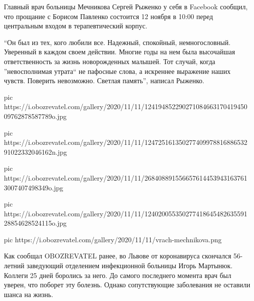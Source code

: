 Главный врач больницы Мечникова Сергей
Рыженко у себя в
Facebook
сообщил, что
прощание с Борисом Павленко состоится 12 ноября в 10:00 перед центральным
входом в терапевтический корпус.

\enquote{Он был из тех, кого любили все. Надежный, спокойный, немногословный. Уверенный
в каждом своем действии. Многие годы на нем была высочайшая ответственность \dshM за жизнь новорожденных малышей. Тот случай, когда }невосполнимая утрата\enquote{ \dshM не
пафосные слова, а искреннее выражение наших чувств. Поверить невозможно.
Светлая память}, \dshM написал Рыженко.

\ifcmt
pic https://i.obozrevatel.com/gallery/2020/11/11/12419485229027108466317041945009762878587789o.jpg

pic https://i.obozrevatel.com/gallery/2020/11/11/12472516135027740997881688653291022332046162n.jpg

pic https://i.obozrevatel.com/gallery/2020/11/11/2684088915566576144539431637613007407498349o.jpg

pic https://i.obozrevatel.com/gallery/2020/11/11/12402005535027741864548263559128854628524115o.jpg

pic https://i.obozrevatel.com/gallery/2020/11/11/vrach-mechnikova.png
\fi

Как сообщал OBOZREVATEL ранее, во Львове от коронавируса скончался 56-летний
заведующий отделением инфекционной больницы Игорь Мартынюк. Коллеги 25 дней
боролись за него. До самого последнего момента врач был уверен, что поборет эту
болезнь. Однако сопутствующие заболевания не оставили шанса на жизнь.
